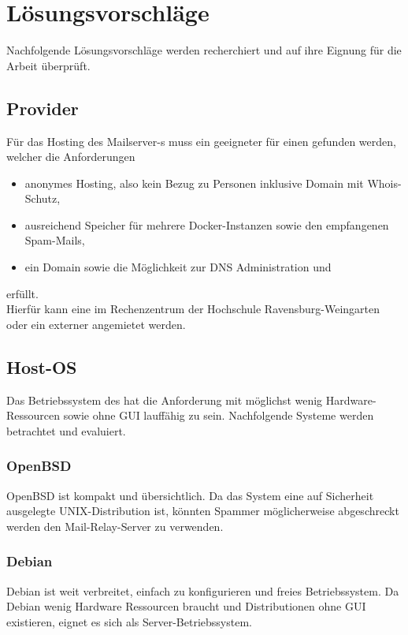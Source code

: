 \documentclass[a4paper,11pt,singlespacing]{article}
\begin{document}
\newpage


\section{Lösungsvorschläge}\label{sec:Lösungsvorschläge}
	Nachfolgende Lösungsvorschläge werden recherchiert und auf ihre Eignung für die Arbeit überprüft.

	\subsection{Provider}\label{sec:Provider}
		Für das Hosting des Mailserver-s muss ein geeigneter  für einen  gefunden werden, welcher die Anforderungen
		\begin{itemize}
			\item anonymes Hosting, also kein Bezug zu Personen inklusive Domain mit Whois-Schutz,
			\item ausreichend Speicher für mehrere Docker-Instanzen sowie den empfangenen Spam-Mails,
			\item ein Domain sowie die Möglichkeit zur DNS Administration und
		\end{itemize}
		erfüllt.\\
		Hierfür kann eine  im Rechenzentrum der Hochschule Ravensburg-Weingarten oder ein externer  angemietet werden.

	\subsection{Host-OS}\label{sec:Host-Maschine}
		Das Betriebssystem des  hat die Anforderung mit möglichst wenig Hardware-Ressourcen sowie ohne GUI lauffähig zu sein.
		Nachfolgende Systeme werden betrachtet und evaluiert.

		\subsubsection{OpenBSD}\label{sec:OpenBSD}
			OpenBSD ist kompakt und übersichtlich.
			Da das System eine auf Sicherheit ausgelegte UNIX-Distribution ist, könnten Spammer möglicherweise abgeschreckt werden den Mail-Relay-Server zu verwenden. \cite{openBSD}

		\subsubsection{Debian}\label{sec:Debian}
			Debian ist weit verbreitet, einfach zu konfigurieren und freies Betriebssystem.
			Da Debian wenig Hardware Ressourcen braucht und Distributionen ohne GUI existieren, eignet es sich als Server-Betriebssystem. \cite{debianVerbreitet} \cite{debian}
\end{document}
